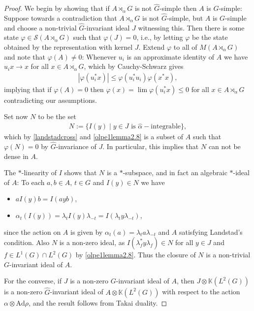 \begin{proof}
	We begin by showing that if $A\rtimes_\alpha G$ is not $\hat G$-simple then $A$ is $G$-simple: Suppose towards a contradiction that $A \rtimes_\alpha G$ is not $\hat G$-simple, but $A$ is $G$-simple and choose a non-trivial $\hat G$-invariant ideal $J$ witnessing this. Then there is some state $\varphi \in \mathcal{S}(A \rtimes_\alpha G)$ such that $\varphi(J) = 0$, i.e., by letting $\varphi$ be the state obtained by the representation with kernel $J$. Extend $\varphi$ to all of $M(A \rtimes_\alpha G)$ and note that $\varphi(A) \neq 0$: Whenever $u_i$ is an approximate identity of $A$ we have $u_i x \to x$ for all $x \in A \rtimes_\alpha G$, which by Cauchy-Schwarz gives
	\begin{align*}
	|\varphi(u_i^* x)| \leq \varphi(u_i^*u_i)\varphi(x^*x),
	\end{align*}
	implying that if $\varphi(A) = 0$ then $\varphi(x) = \lim \varphi(u_i^* x) \leq 0$ for all $x \in A \rtimes_\alpha G$ contradicting our assumptions.
	
	Set now $N$ to be the set
	\begin{align*}
		N:=\{ I(y) \mid y \in J \text{ is } \hat \alpha-\text{integrable}\},
	\end{align*}
	which by \cref{landstadcross} and \cref{olpe1lemma2.8} is a subset of $A$ such that $\varphi(N) = 0$ by $\hat G$-invariance of $J$. In particular, this implies that $N$ can not be dense in $A$.
	
	The $*$-linearity of $I$ shows that $N$ is a $*$-subspace, and in fact an algebraic $*$-ideal of $A$: To each $a,b \in A$, $t \in G$ and $I(y) \in N$ we have
	\begin{itemize}
		\item $a I(y)b = I(ayb)$,
		\item $\alpha_t(I(y))= \lambda_t I(y) \lambda_{-t} = I(\lambda_t y \lambda_{-t})$,
	\end{itemize}
	since the action on $A$ is given by $\alpha_t(a) = \lambda_t a \lambda_{-t}$ and $A$ satisfying Landstad's condition. Also $N$ is a non-zero ideal, as $I(\lambda_f^* y \lambda_f) \in N$ for all $y \in J$ and $f \in L^1(G) \cap L^2(G)$ by \cref{olpe1lemma2.8}. Thus the closure of $N$ is a non-trivial $G$-invariant ideal of $A$.

	For the converse, if $J$ is a non-zero $G$-invariant ideal of $A$, then $J \otimes \mathbb{K}(L^2(G))$ is a non-zero $\hat G$-invariant ideal of $A \otimes \mathbb{K}(L^2(G))$ with respect to the action $\alpha \otimes \mathrm{Ad} \rho$, and the result follows from Takai duality.
\end{proof}
